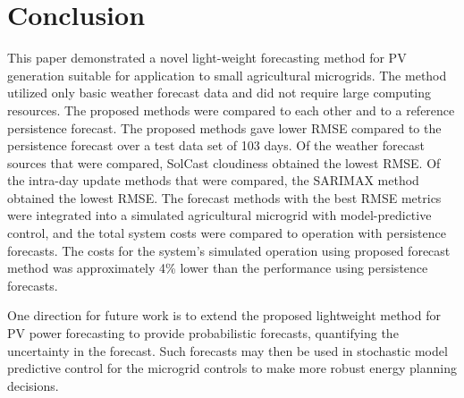 \section{Conclusion}
\label{sec:conclusion}

This paper demonstrated a novel light-weight forecasting method for PV generation suitable for application to small agricultural microgrids.
The method utilized only basic weather forecast data and did not require large computing resources.
The proposed methods were compared to each other and to a reference persistence forecast.
The proposed methods gave lower RMSE compared to the persistence forecast
over a test data set of
103 days.
Of the weather forecast sources that were compared,
SolCast cloudiness
obtained the lowest RMSE.
Of the intra-day update methods that were compared,
the SARIMAX method
obtained the lowest RMSE.
The forecast methods with the best RMSE metrics were integrated into a simulated
agricultural microgrid with model-predictive control,
and the total system costs were compared to operation with persistence forecasts.
The costs for the system's simulated operation using proposed forecast method was approximately
4\% lower than the performance using persistence forecasts.

One direction for future work is to extend the proposed lightweight method for PV power forecasting to provide probabilistic forecasts, quantifying the uncertainty in the forecast.
Such forecasts may then be used in stochastic model predictive control for the microgrid controls to make more robust energy planning decisions.
